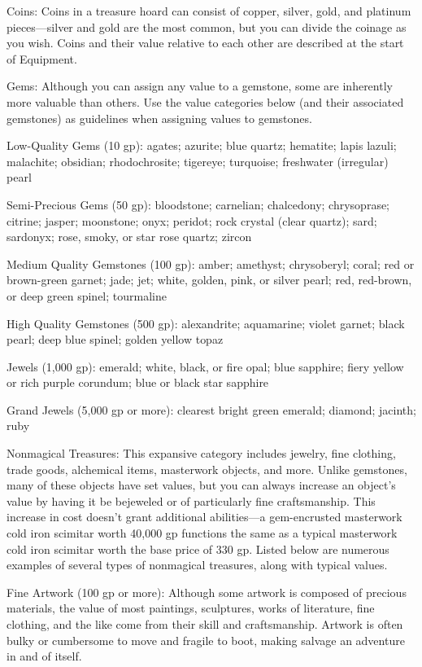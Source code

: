 Coins: Coins in a treasure hoard can consist of copper, silver, gold, and platinum pieces---silver and gold are the most common, but you can divide the coinage as you wish. Coins and their value relative to each other are described at the start of Equipment.
				
Gems: Although you can assign any value to a gemstone, some are inherently more valuable than others. Use the value categories below (and their associated gemstones) as guidelines when assigning values to gemstones.
				
Low-Quality Gems (10 gp): agates; azurite; blue quartz; hematite; lapis lazuli; malachite; obsidian; rhodochrosite; tigereye; turquoise; freshwater (irregular) pearl
				
Semi-Precious Gems (50 gp): bloodstone; carnelian; chalcedony; chrysoprase; citrine; jasper; moonstone; onyx; peridot; rock crystal (clear quartz); sard; sardonyx; rose, smoky, or star rose quartz; zircon
				
Medium Quality Gemstones (100 gp): amber; amethyst; chrysoberyl; coral; red or brown-green garnet; jade; jet; white, golden, pink, or silver pearl; red, red-brown, or deep green spinel; tourmaline
				
High Quality Gemstones (500 gp): alexandrite; aquamarine; violet garnet; black pearl; deep blue spinel; golden yellow topaz
				
Jewels (1,000 gp): emerald; white, black, or fire opal; blue sapphire; fiery yellow or rich purple corundum; blue or black star sapphire
				
Grand Jewels (5,000 gp or more): clearest bright green emerald; diamond; jacinth; ruby
				
Nonmagical Treasures: This expansive category includes jewelry, fine clothing, trade goods, alchemical items, masterwork objects, and more. Unlike gemstones, many of these objects have set values, but you can always increase an object's value by having it be bejeweled or of particularly fine craftsmanship. This increase in cost doesn't grant additional abilities---a gem-encrusted masterwork cold iron scimitar worth 40,000 gp functions the same as a typical masterwork cold iron scimitar worth the base price of 330 gp. Listed below are numerous examples of several types of nonmagical treasures, along with typical values.
				
Fine Artwork (100 gp or more): Although some artwork is composed of precious materials, the value of most paintings, sculptures, works of literature, fine clothing, and the like come from their skill and craftsmanship. Artwork is often bulky or cumbersome to move and fragile to boot, making salvage an adventure in and of itself.
				

